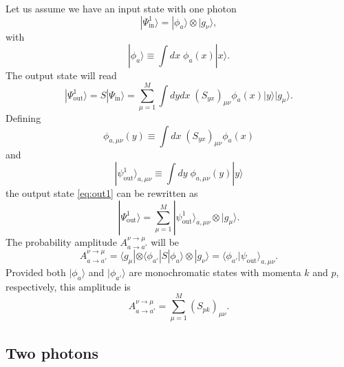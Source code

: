 \documentclass[aps,pra,reprint,amsmath,amssymb]{revtex4-1}
\begin{document}
Let us assume we have an input state with one photon
\begin{equation}
|\Psi_\text{in}^1\rangle=|\phi_a\rangle\otimes |g_\nu\rangle,
\end{equation}
with
\begin{equation}
|\phi_a\rangle\equiv \int dx\; \phi_a(x)|x\rangle.
\end{equation}
The output state will read
\begin{equation}\label{eq:out1}
|\Psi_\text{out}^1\rangle = S|\Psi_\text{in}\rangle = \sum_{\mu=1}^M \int dy dx\;(S_{yx})_{\mu\nu}\phi_a(x)|y\rangle|g_\mu\rangle.
\end{equation}
Defining
\begin{equation}\label{eq:phi_munu}
\phi_{a,\mu\nu}(y)\equiv \int dx\; (S_{yx})_{\mu\nu} \phi_a(x)
\end{equation}
and
\begin{equation}\label{eq:out_munu}
|\psi_\text{out}^1\rangle_{a,\mu\nu}\equiv \int dy\;\phi_{a,\mu\nu}(y) |y\rangle
\end{equation}
the output state \eqref{eq:out1} can be rewritten as
\begin{equation}
|\Psi_\text{out}^1\rangle = \sum_{\mu=1}^M |\psi_\text{out}^1\rangle_{a,\mu\nu}\otimes |g_\mu\rangle.
\end{equation}
The probability amplitude $A_{a\to a'}^{\nu\to\mu}$ will be
\begin{equation}\label{eq:A1}
A_{a\to a'}^{\nu\to\mu} = \langle g_\mu|\otimes \langle \phi_{a'}|S|\phi_a\rangle \otimes |g_\nu\rangle = \langle \phi_{a'}|\psi_\text{out}\rangle_{a,\mu\nu}.
\end{equation}
Provided both $|\phi_a\rangle$ and $|\phi_{a'}\rangle$ are monochromatic states with momenta $k$ and $p$, respectively, this amplitude is
\begin{equation}\label{eq:energy_conservation}
A_{a\to a'}^{\nu\to\mu} = \sum_{\mu=1}^M (S_{pk})_{\mu\nu}.
\end{equation}

\subsection{Two photons}
\end{document}
